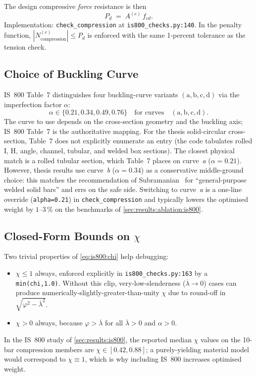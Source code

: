 The design compressive \emph{force} resistance is then
\begin{equation}
  P_d \;=\; A^{(e)}\,f_{cd}.
  \label{eq:is800:Pd}
\end{equation}
Implementation: \texttt{check\_compression} at
\texttt{is800\_checks.py:140}. In the penalty function,
$|N^{(e)}_{\text{compression}}|\le P_d$ is enforced with the
same \num{1}-percent tolerance as the tension check.

\subsection{Choice of Buckling Curve}
\label{app:is800:clause7_1:curve}

IS~800 Table~7 distinguishes four buckling-curve variants
$(\mathrm{a},\mathrm{b},\mathrm{c},\mathrm{d})$ via the
imperfection factor $\alpha$:
\begin{equation}
  \alpha \in \{\num{0.21},\num{0.34},\num{0.49},\num{0.76}\}
  \quad\text{for curves}\quad
  (\mathrm{a},\mathrm{b},\mathrm{c},\mathrm{d}).
\end{equation}
The curve to use depends on the cross-section geometry and the
buckling axis; IS~800 Table~7 is the authoritative mapping. For
the thesis solid-circular cross-section, Table~7 does not
explicitly enumerate an entry (the code tabulates rolled I, H,
angle, channel, tubular, and welded box sections). The
closest physical match is a rolled tubular section, which
Table~7 places on curve~\mbox{\emph{a}} ($\alpha=\num{0.21}$).
However, thesis results use curve~\mbox{\emph{b}}
($\alpha=\num{0.34}$) as a conservative middle-ground choice:
this matches the recommendation of
Subramanian~\cite{subramanian2008} for ``general-purpose
welded solid bars'' and errs on the safe side. Switching to
curve~\mbox{\emph{a}} is a one-line override
(\texttt{alpha=0.21}) in \texttt{check\_compression} and
typically lowers the optimised weight by $\num{1}$--$\num{3}\,\%$
on the benchmarks of
\cref{sec:results:ablation:is800}.

\subsection{Closed-Form Bounds on $\chi$}
\label{app:is800:chi_bounds}

Two trivial properties of \cref{eq:is800:chi} help debugging:
\begin{itemize}
  \item $\chi\le 1$ always, enforced explicitly in
    \texttt{is800\_checks.py:163} by a \texttt{min(chi,1.0)}.
    Without this clip, very-low-slenderness
    ($\overline{\lambda}\to 0$) cases can produce
    numerically-slightly-greater-than-unity $\chi$ due to
    round-off in $\sqrt{\varphi^2-\overline{\lambda}^2}$.
  \item $\chi > 0$ always, because $\varphi>\overline{\lambda}$
    for all $\overline{\lambda}>0$ and $\alpha>0$.
\end{itemize}
In the IS~800 study of
\cref{sec:results:is800}, the reported median $\chi$ values on
the 10-bar compression members are
$\chi\in[\num{0.42},\num{0.88}]$; a purely-yielding material
model would correspond to $\chi\equiv 1$, which is why
including IS~800 increases optimised weight.

